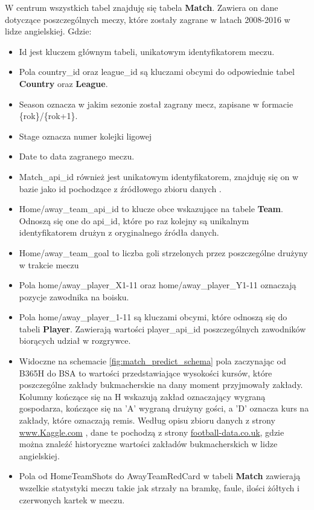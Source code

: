 W centrum wszystkich tabel znajduję się tabela \textbf{Match}. Zawiera on dane dotyczące poszczególnych meczy, które zostały zagrane w latach 2008-2016 w lidze angielskiej. Gdzie: 
\begin{itemize}
    \item Id jest kluczem głównym tabeli, unikatowym identyfikatorem meczu.
    
    \item Pola country\_id oraz league\_id są kluczami obcymi do odpowiednie tabel \textbf{Country} oraz \textbf{League}.
    
    \item Season oznacza w jakim sezonie został zagrany mecz, zapisane w formacie \{rok\}/\{rok+1\}.
    
    \item Stage oznacza numer kolejki ligowej
    
    \item Date to data zagranego meczu.
    
    \item Match\_api\_id również jest unikatowym identyfikatorem, znajduję się on w bazie jako id pochodzące z źródłowego zbioru danych         \cite{football_data_enetscore}.
    
    \item Home/away\_team\_api\_id to klucze obce wskazujące na tabele \textbf{Team}. Odnoszą się one do api\_id, które po raz kolejny są       unikalnym identyfikatorem drużyn z oryginalnego źródła danych.
    
    \item Home/away\_team\_goal to liczba goli strzelonych przez poszczególne drużyny w trakcie meczu
    
    \item Pola home/away\_player\_X1-11 oraz home/away\_player\_Y1-11 oznaczają pozycje zawodnika na boisku.
    
    \item Pola home/away\_player\_1-11 są kluczami obcymi, które odnoszą się do tabeli \textbf{Player}. Zawierają wartości player\_api\_id poszczególnych zawodników biorących udział w rozgrywce.
    
    \item Widoczne na schemacie \ref{fig:match_predict_schema} pola zaczynając od B365H do BSA to wartości przedstawiające wysokości kursów, które poszczególne zakłady bukmacherskie na dany moment przyjmowały zakłady. Kolumny kończące się na H wskazują zakład oznaczający wygraną gospodarza, kończące się na 'A' wygraną drużyny gości, a 'D' oznacza kurs na zakłady, które oznaczają remis. Według opisu zbioru danych z strony \url{www.Kaggle.com} \cite{kagggle_european_soccer_database}, dane te pochodzą z strony \url{football-data.co.uk}, gdzie można znaleźć historyczne wartości zakładów bukmacherskich w lidze angielskiej.
    
    \item Pola od HomeTeamShots do AwayTeamRedCard w tabeli \textbf{Match} zawierają wszelkie statystyki meczu takie jak strzały na bramkę, faule, ilości żółtych i czerwonych kartek w meczu.
\end{itemize}

